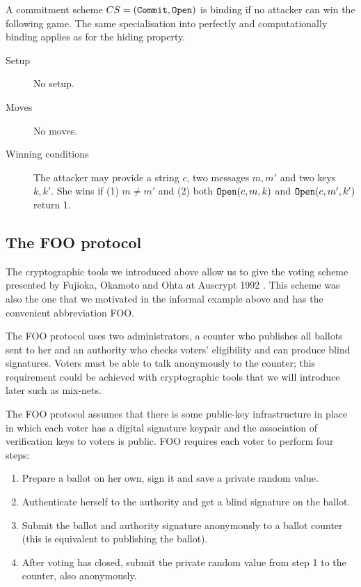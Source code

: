 \documentclass{llncs}
\newcommand{\alg}[1]{\textup{\texttt{#1}}}
\begin{document}
\begin{definition}
A commitment scheme $CS = (\alg{Commit}, \alg{Open})$ is binding if no attacker
can win the following game. The same specialisation into perfectly and
computationally binding applies as for the hiding property.

\begin{description}
\item[Setup]
No setup.

\item[Moves]
No moves.

\item[Winning conditions]
The attacker may provide a string $c$, two messages $m, m'$ and two keys
$k, k'$. She wins if (1) $m \neq m'$ and (2) both $\alg{Open}(c, m, k)$ and
$\alg{Open}(c, m', k')$ return 1.
\end{description}
\end{definition}

\subsection{The FOO protocol}

The cryptographic tools we introduced above allow us to give the voting scheme
presented by Fujioka, Okamoto and Ohta at Auscrypt 1992 \cite{FOO92}. This
scheme was also the one that we motivated in the informal example above and has
the convenient abbreviation FOO.

The FOO protocol uses two administrators, a counter who publishes all ballots
sent to her and an authority who checks voters' eligibility and can produce
blind signatures. Voters must be able to talk anonymously to the counter; this
requirement could be achieved with cryptographic tools that we will introduce
later such as mix-nets.

The FOO protocol assumes that there is some public-key infrastructure in place
in which each voter has a digital signature keypair and the association of
verification keys to voters is public. FOO requires each voter to perform four
steps:
\begin{enumerate}
\item Prepare a ballot on her own, sign it and save a private random value.
\item Authenticate herself to the authority and get a blind signature on the ballot.
\item Submit the ballot and authority signature anonymously to a ballot counter (this is equivalent to publishing the ballot).
\item After voting has closed, submit the private random value from step 1 to the counter, also anonymously.
\end{enumerate}
\end{document}
